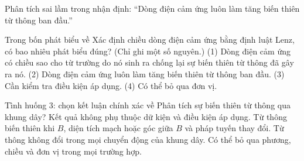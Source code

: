 \begin{bt}
Phân tích sai lầm trong nhận định: “Dòng điện cảm ứng luôn làm tăng biến thiên từ thông ban đầu.”
\end{bt}

\begin{ex}
Trong bốn phát biểu về Xác định chiều dòng điện cảm ứng bằng định luật Lenz, có bao nhiêu phát biểu đúng? (Chỉ ghi một số nguyên.) (1) Dòng điện cảm ứng có chiều sao cho từ trường do nó sinh ra chống lại sự biến thiên từ thông đã gây ra nó. (2) Dòng điện cảm ứng luôn làm tăng biến thiên từ thông ban đầu. (3) Cần kiểm tra điều kiện áp dụng. (4) Có thể bỏ qua đơn vị.
\end{ex}

\begin{ex}
Tình huống 3: chọn kết luận chính xác về Phân tích sự biến thiên từ thông qua khung dây?
\choice
{Kết quả không phụ thuộc dữ kiện và điều kiện áp dụng.}
{\True Từ thông biến thiên khi $B$, diện tích mạch hoặc góc giữa $B$ và pháp tuyến thay đổi.}
{Từ thông không đổi trong mọi chuyển động của khung dây.}
{Có thể bỏ qua phương, chiều và đơn vị trong mọi trường hợp.}
\end{ex}

